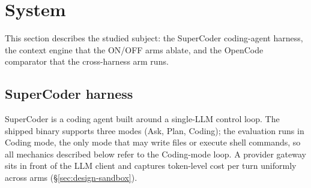 %
%
%

\section{System}
\label{sec:system}

This section describes the studied subject: the SuperCoder coding-agent harness,
the context engine that the ON/OFF arms ablate, and the OpenCode comparator that
the cross-harness arm runs.

\subsection{SuperCoder harness}
\label{sec:system-harness}

SuperCoder \citep{supercoder2024} is a coding agent built around a single-LLM control loop. The
shipped binary supports three modes (Ask, Plan, Coding); the evaluation runs in Coding
mode, the only mode that may write files or execute shell commands, so all
mechanics described below refer to the Coding-mode loop. A provider gateway sits
in front of the LLM client and captures token-level cost per turn uniformly across
arms (\S\ref{sec:design-sandbox}).

